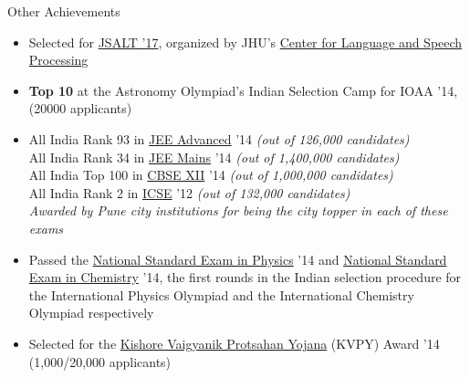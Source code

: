 \documentclass{resume} %
\begin{document}
\begin{rSection}{Other Achievements}
\begin{itemize}[leftmargin=*]
\item Selected for \href{https://www.lti.cs.cmu.edu/2017-jsalt-undergraduate}{JSALT '17}, organized by JHU's \href{https://www.clsp.jhu.edu/}{Center for Language and Speech Processing}\footnotemark[2] 
\item \textbf{Top 10} at the Astronomy Olympiad's Indian Selection Camp for IOAA '14, (20000 applicants)
\item All India Rank 93 in \href{https://en.wikipedia.org/wiki/Joint_Entrance_Examination}{JEE Advanced} '14 \textit{(out of 126,000 candidates)} \\ All India Rank 34 in \href{https://en.wikipedia.org/wiki/Joint_Entrance_Examination}{JEE Mains} '14 \textit{(out of 1,400,000 candidates)} \\
All India Top 100 in \href{https://en.wikipedia.org/wiki/Central_Board_of_Secondary_Education}{CBSE XII} '14 \textit{(out of 1,000,000 candidates)} \\
All India Rank 2 in \href{https://en.wikipedia.org/wiki/Indian_Certificate_of_Secondary_Education}{ICSE} '12 \textit{(out of 132,000 candidates)}\\
{\color{red} \textit{Awarded by Pune city institutions for being the city topper in each of these exams}}
\item Passed the \href{https://www.iapt.org.in/exams/nse/nsep.html}{National Standard Exam in Physics} '14 and \href{https://www.iapt.org.in/exams/nse/nsec-b-a-js.html}{National Standard Exam in Chemistry} '14, the first rounds in the Indian selection procedure for the International Physics Olympiad and the International Chemistry Olympiad respectively
\item Selected for the \href{http://www.kvpy.iisc.ernet.in/main/index.htm}{Kishore Vaigyanik Protsahan Yojana} (KVPY) Award '14 (1,000/20,000 applicants)
\end{itemize}
\end{rSection}
\end{document}
